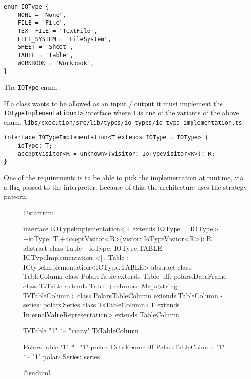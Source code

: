 \begin{listing}
	\begin{verbatim}
enum IOType {
	NONE = 'None',
	FILE = 'File',
	TEXT_FILE = 'TextFile',
	FILE_SYSTEM = 'FileSystem',
	SHEET = 'Sheet',
	TABLE = 'Table',
	WORKBOOK = 'Workbook',
}
\end{verbatim}
	\caption{The \texttt{IOType} enum}
\end{listing}

If a class wants to be allowed as an input / output it must implement the \texttt{IOTypeImplementation<T>} interface where \texttt{T} is one of the variants of the above enum.
\texttt{libs/execution/src/lib/types/io-types/io-type-implementation.ts}:

\begin{verbatim}
interface IOTypeImplementation<T extends IOType = IOType> {
	ioType: T;
	acceptVisitor<R = unknown>(visitor: IoTypeVisitor<R>): R;
}
\end{verbatim}

One of the requirements is to be able to pick the implementation at runtime, via a flag passed to the interpreter.
Because of this, the architecture uses the strategy pattern. %

\begin{figure}
	\begin{plantuml}
		@startuml

		interface IOTypeImplementation<T extends IOType = IOType> {
				+ioType: T
				+acceptVisitor<R>(vistor: IoTypeVisitor<R>): R
			}
		abstract class Table {
				+ioType: IOType.TABLE
			}
		IOTypeImplementation <|.. Table : IOtypeImplementation<IOType.TABLE>
		abstract class TableColumn {
			}
		class PolarsTable extends Table {
				-df: polars.DataFrame
			}
		class TsTable extends Table {
				+columns: Map<string, TsTableColumn>
			}
		class PolarsTableColumn extends TableColumn {
				-series: polars.Series
			}
		class TsTableColumn<T extends InternalValueRepresentation> extends TableColumn {
			}



		TsTable "1" *-- "many" TsTableColumn

		PolarsTable "1" *-- "1" polars.DataFrame: df
		PolarsTableColumn "1" *-- "1" polars.Series: series

		@enduml
	\end{plantuml}
\end{figure}


